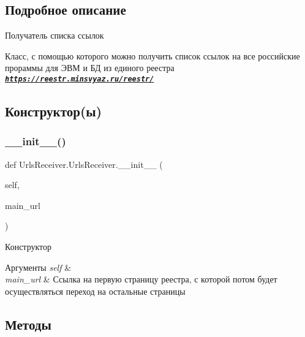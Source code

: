 \subsection{Подробное описание}
Получатель списка ссылок 

Класс, с помощью которого можно получить список ссылок на все российские прораммы для ЭВМ и БД из единого реестра {\itshape {\bfseries \href{https://reestr.minsvyaz.ru/reestr/}{\tt https\+://reestr.\+minsvyaz.\+ru/reestr/}}} 

\subsection{Конструктор(ы)}
\mbox{\label{classUrlsReceiver_1_1UrlsReceiver_ae4ba1b935dce3bd30912583beca32aff}} 
\subsubsection{\texorpdfstring{\+\_\+\+\_\+init\+\_\+\+\_\+()}{\_\_init\_\_()}}
{\footnotesize\ttfamily def Urls\+Receiver.\+Urls\+Receiver.\+\_\+\+\_\+init\+\_\+\+\_\+ (\begin{DoxyParamCaption}\item[{}]{self,  }\item[{}]{main\+\_\+url }\end{DoxyParamCaption})}



Конструктор 


\begin{DoxyParams}{Аргументы}
{\em self} & \\
\hline
{\em main\+\_\+url} & Ссылка на первую страницу реестра, с которой потом будет осуществляться переход на остальные страницы \\
\hline
\end{DoxyParams}


\subsection{Методы}
\mbox{\label{classUrlsReceiver_1_1UrlsReceiver_a448316919bfe59e35942edc34f2b674b}} 
